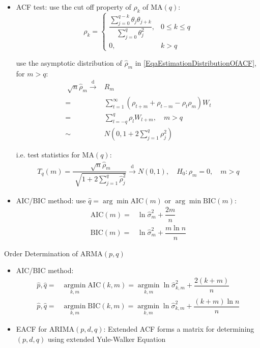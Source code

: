 \begin{itemize}[topsep=2pt,itemsep=0pt]
    \item ACF test: use the cut off property of $ \rho  _k $ of MA$ (q) $:
    \begin{equation}
        \rho  _k=\begin{cases}
            \dfrac{\sum_{j=0}^{q-k}\theta _j\theta _{j+k}}{\sum_{j=0}^q\theta _j^2},&0\leq k\leq q\\
            0,&k>q
        \end{cases} 
    \end{equation}

    use the asymptotic distribution of $ \hat{\rho }_m $ in \autoref{EqaEstimationDistributionOfACF}, for $ m>q $:
    \begin{align}
        \sqrt[]{n}\hat{\rho }_m\xrightarrow[]{\mathrm{d}}& R_m\\
         =&\sum_{t=1}^\infty(\rho _{t+m}+\rho _{t-m}-\rho _t\rho _m)W_t\\
         =&\sum_{l=-q}^q\rho _lW_{l+m},\quad m>q\\
         \sim&N(0,1+2\sum_{j=1}^q\rho _j^2)
    \end{align}
    
    i.e. test statistics for MA$ (q) $:
    \begin{align}
        T_q(m)=\dfrac{\sqrt[]{n}\hat{\rho }_m}{\sqrt[]{1+2\sum_{j=1}^q\hat{\rho }_j^2}}\xrightarrow[]{\mathrm{d}} N(0,1),\quad H_0:\rho _m=0, \quad m>q 
    \end{align}
    
    \item AIC/BIC method: use $\hat{q}= \arg\min \mathrm{AIC}(m)  $ or $ \arg\min\mathrm{BIC}(m)  $:
    \begin{align}
        \mathrm{AIC}(m)=&\ln \hat{\sigma }_m^2+\dfrac{2m}{n}\\
        \mathrm{BIC}(m)=&\ln \hat{\sigma }_m^2+\dfrac{m\ln n}{n}
    \end{align}

\end{itemize}

\begin{point}
    Order Determination of ARMA$ (p,q) $
\end{point}

\begin{itemize}[topsep=2pt,itemsep=0pt]
    \item AIC/BIC method:
    \begin{align}
        \hat{p},\hat{q}=&\mathop{\arg\min}\limits_{k,m}\mathrm{AIC}(k,m)=  \mathop{\arg\min}\limits_{k,m}\ln \hat{\sigma }^2_{k,m}+\dfrac{2(k+m)}{n}\\
        \hat{p},\hat{q}=&\mathop{\arg\min}\limits_{k,m}\mathrm{BIC}(k,m)=  \mathop{\arg\min}\limits_{k,m}\ln \hat{\sigma }^2_{k,m}+\dfrac{(k+m)\ln n}{n}
    \end{align}
    \item EACF for ARIMA$ (p,d,q) $: Extended ACF forms a matrix for determining $ (p,d,q) $ using extended Yule-Walker Equation 
\end{itemize}

